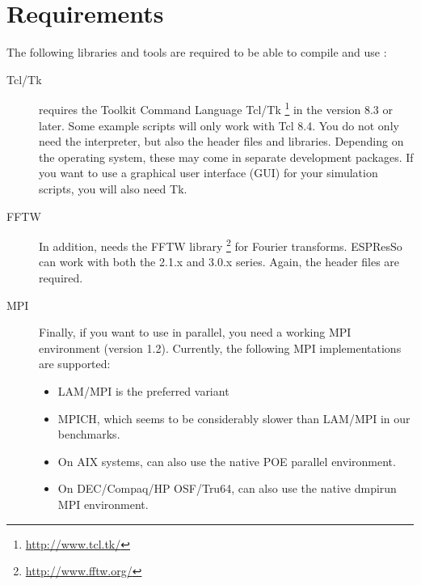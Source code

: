 \section{Requirements}
\label{sec:requirements}

The following libraries and tools are required to be able to compile
and use \es:

\begin{description}
\item[Tcl/Tk]  \es{} requires the Toolkit Command
  Language Tcl/Tk \footnote{\url{http://www.tcl.tk/}} in the version
  8.3 or later.  Some example scripts will only work with Tcl 8.4. You
  do not only need the interpreter, but also the header files and
  libraries.  Depending on the operating system, these may come in
  separate development packages. If you want to use a graphical user
  interface (GUI) for your simulation scripts, you will also need Tk.
  
\item[FFTW]  In addition, \es{} needs the FFTW library
  \footnote{\url{http://www.fftw.org/}} for Fourier transforms.
  ESPResSo can work with both the 2.1.x and 3.0.x series. Again, the
  header files are required.
  
\item[MPI]  Finally, if you want to use \es{} in parallel,
  you need a working MPI environment (version 1.2). Currently, the
  following MPI implementations are supported:
  \begin{itemize}
  \item LAM/MPI is the preferred variant
  \item MPICH, which seems to be considerably slower than LAM/MPI in
    our benchmarks.
  \item On AIX systems, \es{} can also use the native POE parallel
    environment.
  \item On DEC/Compaq/HP OSF/Tru64, \es{} can also use the native
    dmpirun MPI environment.
  \end{itemize}
\end{description}

